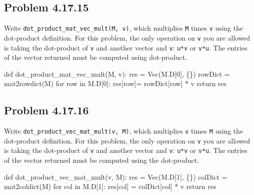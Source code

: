 \documentclass[
  letterpaper,
  DIV=11,
  numbers=noendperiod]{scrartcl}
\newenvironment{Shaded}{\begin{snugshade}}{\end{snugshade}}
\newcommand{\ControlFlowTok}[1]{\textcolor[rgb]{0.00,0.23,0.31}{#1}}
\newcommand{\DecValTok}[1]{\textcolor[rgb]{0.68,0.00,0.00}{#1}}
\newcommand{\KeywordTok}[1]{\textcolor[rgb]{0.00,0.23,0.31}{#1}}
\newcommand{\NormalTok}[1]{\textcolor[rgb]{0.00,0.23,0.31}{#1}}
\newcommand{\OperatorTok}[1]{\textcolor[rgb]{0.37,0.37,0.37}{#1}}
\begin{document}
\hypertarget{problem-4.17.15}{%
\subsection{Problem 4.17.15}\label{problem-4.17.15}}

Write \texttt{dot\_product\_mat\_vec\_mult(M,\ v)}, which multiplies
\texttt{M} times \texttt{v} using the dot-product definition. For this
problem, the only operation on \texttt{v} you are allowed is taking the
dot-product of \texttt{v} and another vector and \texttt{v}:
\texttt{u*v} or \texttt{v*u}. The entries of the vector returned must be
computed using dot-product.

\begin{Shaded}
\begin{Highlighting}[numbers=left,,]
\KeywordTok{def}\NormalTok{ dot\_product\_mat\_vec\_mult(M, v):}
\NormalTok{    res }\OperatorTok{=}\NormalTok{ Vec(M.D[}\DecValTok{0}\NormalTok{], \{\})}
\NormalTok{    rowDict }\OperatorTok{=}\NormalTok{ mat2rowdict(M)}
    \ControlFlowTok{for}\NormalTok{ row }\KeywordTok{in}\NormalTok{ M.D[}\DecValTok{0}\NormalTok{]:}
\NormalTok{        res[row]}\OperatorTok{=}\NormalTok{ rowDict[row] }\OperatorTok{*}\NormalTok{ v}
    \ControlFlowTok{return}\NormalTok{ res}
\end{Highlighting}
\end{Shaded}

\hypertarget{problem-4.17.16}{%
\subsection{Problem 4.17.16}\label{problem-4.17.16}}

Write \texttt{dot\_product\_vec\_mat\_mult(v,\ M)}, which multiplies
\texttt{v} times \texttt{M} using the dot-product definition. For this
problem, the only operation on \texttt{v} you are allowed is taking the
dot-product of \texttt{v} and another vector and \texttt{v}:
\texttt{u*v} or \texttt{v*u}. The entries of the vector returned must be
computed using the dot-product.

\begin{Shaded}
\begin{Highlighting}[numbers=left,,]
\KeywordTok{def}\NormalTok{ dot\_product\_vec\_mat\_mult(v, M):}
\NormalTok{  res }\OperatorTok{=}\NormalTok{ Vec(M.D[}\DecValTok{1}\NormalTok{], \{\})}
\NormalTok{  colDict }\OperatorTok{=}\NormalTok{ mat2coldict(M)}
  \ControlFlowTok{for}\NormalTok{ col }\KeywordTok{in}\NormalTok{ M.D[}\DecValTok{1}\NormalTok{]:}
\NormalTok{      res[col] }\OperatorTok{=}\NormalTok{ colDict[col] }\OperatorTok{*}\NormalTok{ v}
    \ControlFlowTok{return}\NormalTok{ res}
\end{Highlighting}
\end{Shaded}
\end{document}

